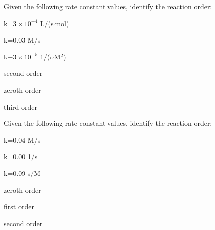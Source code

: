 \documentclass[main.tex]{subfiles}
\begin{document}
\begin{multicols*}{2}
\begin{question}[ID=\the\value{numA}]
Given the following rate constant values, identify the reaction order:
\begin{inparaenum}[(a)]

\item  k=$3\times 10^{-4}$ L/(s$\cdot$mol) %
\item k=0.03 M/s %
\item  k=$3\times 10^{-5}$ 1/(s$\cdot$M$^2$) %
\end{inparaenum}
\end{question}
\begin{solution}
\begin{inparaenum}[(a)]

\item   second order 
\item  zeroth order 
\item   third order 
\end{inparaenum}\hspace{0.1cm}\end{solution}%
	    	         
                 
\begin{question}[ID=\the\value{numA}]
Given the following rate constant values, identify the reaction order:
\begin{inparaenum}[(a)]
\item  k=0.04 M/s  	%
\item   k=0.00 1/s 	%
\item  k=0.09 s/M	%

\end{inparaenum}
\end{question}
\begin{solution}
\begin{inparaenum}[(a)]
\item    zeroth order 
\item    first order 
\item   second order 
\end{inparaenum}\hspace{0.1cm}\end{solution}%



\end{multicols*}
\end{document}
